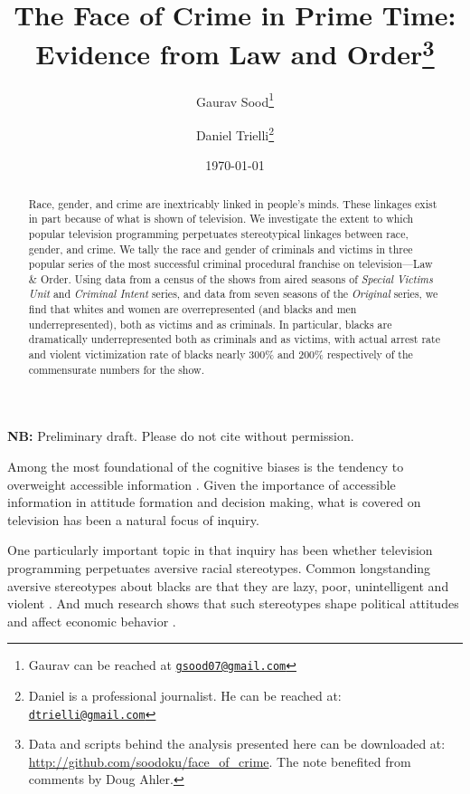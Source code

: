 \documentclass[12pt, letterpaper]{article}
\title{\Large{The Face of Crime in Prime Time:\\ Evidence from Law and Order}\footnote{Data and scripts behind the analysis presented here can be downloaded at: \url{http://github.com/soodoku/face_of_crime}. The note benefited from comments by Doug Ahler.}}
\author{Gaurav Sood\thanks{Gaurav can be reached at \href{mailto:gsood07@gmail.com}{\footnotesize{\texttt{gsood07@gmail.com}}}} \and Daniel Trielli\thanks{Daniel is a professional journalist. He can be reached at: \href{mailto:dtrielli@gmail.com}{\footnotesize{\texttt{dtrielli@gmail.com}}}}\vspace{.5cm}}
\date{\vspace{.5cm}\normalsize{\today}}
\begin{document}
\maketitle

\begin{center}
\vspace{.5cm}\textbf{NB:} Preliminary draft. Please do not cite without permission.\vspace{1.5cm}
\end{center}

\begin{abstract}
\noindent Race, gender, and crime are inextricably linked in people's minds. These linkages exist in part because of what is shown of television. We investigate the extent to which popular television programming perpetuates stereotypical linkages between race, gender, and crime. We tally the race and gender of criminals and victims in three popular series of the most successful criminal procedural franchise on television---Law \& Order. Using data from a census of the shows from aired seasons of \textit{Special Victims Unit} and \textit{Criminal Intent} series, and data from seven seasons of the \textit{Original} series, we find that whites and women are overrepresented (and blacks and men underrepresented), both as victims and as criminals. In particular, blacks are dramatically underrepresented both as criminals and as victims, with actual arrest rate and violent victimization rate of blacks nearly 300\% and 200\% respectively of the commensurate numbers for the show. 
\end{abstract}
\clearpage
\doublespace

Among the most foundational of the cognitive biases is the tendency to overweight accessible information \citep{tversky1973availability, iyengar2010news, iyengar1990accessibility}. Given the importance of accessible information in attitude formation and decision making, what is covered on television has been a natural focus of inquiry. 

One particularly important topic in that inquiry has been whether television programming perpetuates aversive racial stereotypes. Common longstanding aversive stereotypes about blacks are that they are lazy, poor, unintelligent and violent \citep{katz1933racial}. And much research shows that such stereotypes shape political attitudes \citep[see, for e.g.,][]{sniderman1995scar, hurwitz1997public, peffley1997racial, dixon2006psychological} and affect economic behavior \citep[see, for e.g.,][]{bertrand2004emily}. 
\end{document}
